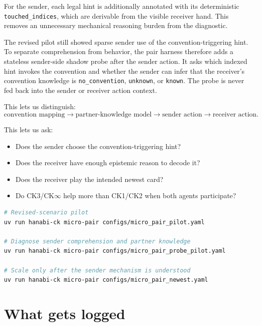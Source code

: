 \documentclass[11pt,a4paper]{article}
\begin{document}
For the sender, each legal hint is additionally annotated with its deterministic
\texttt{touched\_indices}, which are derivable from the visible receiver hand.
This removes an unnecessary mechanical reasoning burden from the diagnostic.

The revised pilot still showed sparse sender use of the convention-triggering
hint. To separate comprehension from behavior, the pair harness therefore adds
a stateless sender-side shadow probe after the sender action. It asks which
indexed hint invokes the convention and whether the sender can infer that the
receiver's convention knowledge is \texttt{no\_convention},
\texttt{unknown}, or \texttt{known}. The probe is never fed back into the
sender or receiver action context.

This lets us distinguish:
\[
\text{convention mapping}
\rightarrow
\text{partner-knowledge model}
\rightarrow
\text{sender action}
\rightarrow
\text{receiver action}.
\]

This lets us ask:
\begin{itemize}
\item Does the sender choose the convention-triggering hint?
\item Does the receiver have enough epistemic reason to decode it?
\item Does the receiver play the intended newest card?
\item Do CK3/CK$\infty$ help more than CK1/CK2 when both agents participate?
\end{itemize}

\begin{lstlisting}[language=bash]
# Revised-scenario pilot
uv run hanabi-ck micro-pair configs/micro_pair_pilot.yaml

# Diagnose sender comprehension and partner knowledge
uv run hanabi-ck micro-pair configs/micro_pair_probe_pilot.yaml

# Scale only after the sender mechanism is understood
uv run hanabi-ck micro-pair configs/micro_pair_newest.yaml
\end{lstlisting}

\section{What gets logged}
\end{document}
